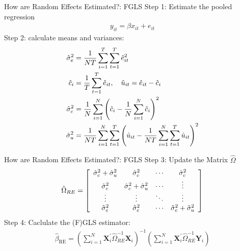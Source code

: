 \begin{frame}{How are Random Effects Estimated?: FGLS}
Step 1: Estimate the \alert{pooled regression}
\begin{align*}
y_{it} = \beta x_{it} + e_{it}
\end{align*}
Step 2: calculate means and variances:
\begin{align*}
\footnotesize
\hat { \sigma } _ { e } ^ { 2 } &= \frac { 1 } { N T } \sum _ { i = 1 } ^ { T } \sum _ { t = 1 } ^ { T } \hat { e } _ { i t } ^ { 2 }\\
\hat { c } _ { i } &= \frac { 1 } { T } \sum _ { t = 1 } ^ { T } \hat { e } _ { i t } , \quad \hat { u } _ { i t } = \hat { e } _ { i t } - \hat {c } _ { i }\\
\hat { \sigma } _ { c } ^ { 2 } &= \frac { 1 } { N } \sum _ { i = 1 } ^ { N } \left( \hat { c } _ { i } - \frac { 1 } { N } \sum _ { i = 1 } ^ { N } \hat { c } _ { i } \right) ^ { 2 }\\
\hat { \sigma } _ { u } ^ { 2 } &= \frac { 1 } { N T } \sum _ { i = 1 } ^ { N } \sum _ { t = 1 } ^ { T } \left( \hat { u } _ { i t } - \frac { 1 } { N T } \sum _ { i = 1 } ^ { N } \sum _ { t = 1 } ^ { T } \hat { u } _ { i t } \right) ^ { 2 }
\end{align*}
\end{frame}

\begin{frame}{How are Random Effects Estimated?: FGLS}
Step 3: Update the Matrix $\widehat{\Omega}$
\begin{align*}
\hat { \Omega }_{RE} = \left[ \begin{array} { c c c c } { \hat { \sigma } _ { c } ^ { 2 } + \hat { \sigma } _ { u } ^ { 2 } } & { \hat { \sigma } _ { c } ^ { 2 } } & { \cdots } & { \hat { \sigma } _ { c } ^ { 2 } } \\ { \hat { \sigma } _ { c } ^ { 2 } } & { \hat { \sigma } _ { c } ^ { 2 } + \hat { \sigma } _ { u } ^ { 2 } } & { \cdots } & { \vdots } \\ { \vdots } & { \vdots } & { \ddots } & { \vdots } \\ { \hat { \sigma } _ { c } ^ { 2 } } & { \hat { \sigma } _ { c } ^ { 2 } } & { \cdots } & { \hat { \sigma } _ { c } ^ { 2 } + \hat { \sigma } _ { u } ^ { 2 } } \end{array} \right]
\end{align*}
Step 4: Caclulate the (F)GLS estimator:
\begin{align*}
\hat { \beta} _ { \mathrm { RE } } = \left( \sum _ { i = 1 } ^ { N } \mathbf{X} _ { i } ^ { \prime } \hat { \Omega }_{RE} ^ { - 1 } \mathbf{X} _ { i } \right) ^ { - 1 } \left( \sum _ { i = 1 } ^ { N } \mathbf{X} _ { i } ^ { \prime } \hat { \Omega }_{RE} ^ { - 1 } \mathbf{Y} _ { i } \right)
\end{align*}
\end{frame}


